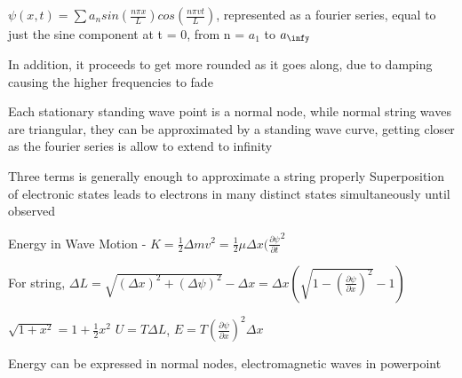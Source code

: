 \documentclass[11 pt, twoside]{article}
\begin{document}
$\psi(x, t) = \sum a_n sin(\frac{n\pi x}{L})cos(\frac{n\pi vt}{L})$, represented as a fourier series, equal to just the sine component at t = 0, from n = $a_1$ to $a_\infy$

In addition, it proceeds to get more rounded as it goes along, due to damping causing the higher frequencies to fade

Each stationary standing wave point is a normal node, while normal string waves are triangular, they can be approximated by a standing wave curve, getting closer as the fourier series is allow to extend to infinity

Three terms is generally enough to approximate a string properly
Superposition of electronic states leads to electrons in many distinct states simultaneously until observed

Energy in Wave Motion - $K = \frac{1}{2}\Delta mv^2  = \frac{1}{2} \mu \Delta x (\frac{\partial \psi}{\partial t}^2$

For string, $\Delta L = \sqrt{(\Delta x)^2 + (\Delta \psi)^2} - \Delta x = \Delta x (\sqrt{1 - (\frac{\partial \psi}{\partial x})^2} - 1)$

$\sqrt{1 + x^2} = 1 + \frac{1}{2}x^2$
$U = T\Delta L$, $E = T(\frac{\partial \psi}{\partial x})^2 \Delta x$

Energy can be expressed in normal nodes, electromagnetic waves in powerpoint
\end{document}
